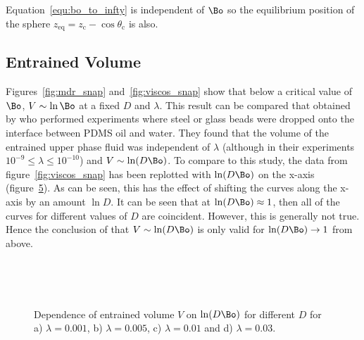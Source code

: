 {Equation~\ref{equ:bo_to_infty} is independent of $\Bo$ so the equilibrium position of the sphere $z_{\text{eq}} = z_{\text{c}} - \cos \theta_{\text{c}}$ is also. 

\subsection{Entrained Volume}
\label{subsec:dis_ent_vol}

Figures~\ref{fig:mdr_snap} and~\ref{fig:viscos_snap} show that below a critical value of $\Bo$, $V \sim \ln \Bo$ at a fixed $D$ and $\lambda$. This result can be compared that obtained by \citet{Pitois99} who performed experiments where steel or glass beads were dropped onto the interface between PDMS oil and water. They found that the volume of the entrained upper phase fluid was independent of $\lambda$ (although in their experiments $10^{-9} \leq \lambda \leq 10^{-10}$) and $V \sim \ln(D \Bo)$. To compare to this study, the data from figure~\ref{fig:viscos_snap} has been replotted with $\ln(D \Bo)$ on the x-axis (figure~\ref{fig:viscos_snap_DBo}). As can be seen, this has the effect of shifting the curves along the x-axis by an amount $\ln D$. It can be seen that at $\ln(D \Bo) \approx 1$, then all of the curves for different values of $D$ are coincident. However, this is generally not true. Hence the conclusion of \citet{Pitois99} that $V \sim \ln(D \Bo)$ is only valid for $\ln(D \Bo) \to 1$ from above. 

    \begin{figure}
      \centering
      \begin{subfigure}[b]{0.45\textwidth}
        \resizebox{\textwidth}{!}{\Large }
        \caption{}
        \label{fig:viscos_rat=0.001_DBo}
      \end{subfigure}
      ~
      \begin{subfigure}[b]{0.45\textwidth}
        \resizebox{\textwidth}{!}{\Large }
        \caption{}
        \label{fig:viscos_rat=0.005_DBo}
      \end{subfigure}
      
      \begin{subfigure}[b]{0.45\textwidth}
        \resizebox{\textwidth}{!}{\Large }
        \caption{}
        \label{fig:viscos_rat=0.01_DBo}
      \end{subfigure}
      ~
      \begin{subfigure}[b]{0.45\textwidth}
        \resizebox{\textwidth}{!}{\Large }
        \caption{}
        \label{fig:mdr=viscos_rat=0.03_DBo}
      \end{subfigure}
      \caption{Dependence of entrained volume $V$ on $\ln(D \Bo)$ for different $D$ for a) $\lambda = 0.001$, b) $\lambda = 0.005$, c) $\lambda = 0.01$ and d) $\lambda = 0.03$. }\label{fig:viscos_snap_DBo}
    \end{figure}

}
